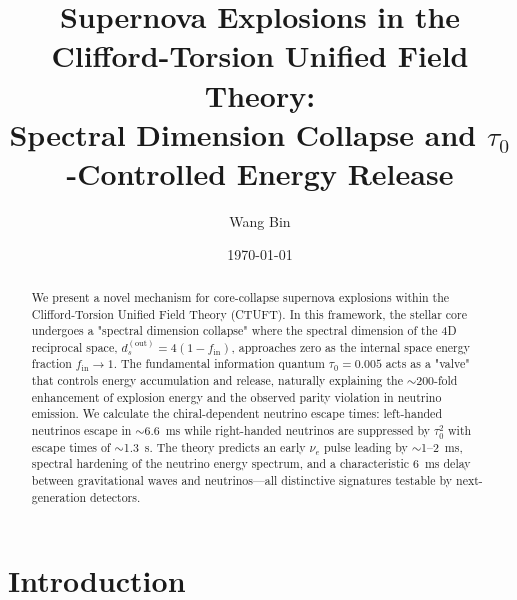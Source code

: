 \documentclass[twocolumn, tightenlines, showpacs, showkeys, nofootinbib]{revtex4-1}
\newcommand{\ctuft}{\textsc{CTUFT}}
\newcommand{\dout}{d_s^{(\text{out})}}
\newcommand{\tauzero}{\tau_0}
\begin{document}
\title{Supernova Explosions in the Clifford-Torsion Unified Field Theory: \\
Spectral Dimension Collapse and $\tau_0$-Controlled Energy Release}

\author{Wang Bin}

\date{\today}

\begin{abstract}
We present a novel mechanism for core-collapse supernova explosions within the 
Clifford-Torsion Unified Field Theory (\ctuft). In this framework, the stellar core 
undergoes a "spectral dimension collapse" where the spectral dimension of the 
4D reciprocal space, $\dout = 4(1-f_{\text{in}})$, approaches zero as the 
internal space energy fraction $f_{\text{in}} \to 1$. The fundamental information 
quantum $\tauzero = 0.005$ acts as a "valve" that controls energy accumulation 
and release, naturally explaining the $\sim$200-fold enhancement of explosion 
energy and the observed parity violation in neutrino emission. We calculate the 
chiral-dependent neutrino escape times: left-handed neutrinos escape in 
$\sim$6.6~ms while right-handed neutrinos are suppressed by $\tauzero^2$ with 
escape times of $\sim$1.3~s. The theory predicts an early $\nu_e$ pulse leading 
by $\sim$1--2~ms, spectral hardening of the neutrino energy spectrum, and a 
characteristic 6~ms delay between gravitational waves and neutrinos---all 
distinctive signatures testable by next-generation detectors.
\end{abstract}



\maketitle

\section{Introduction}
\end{document}
